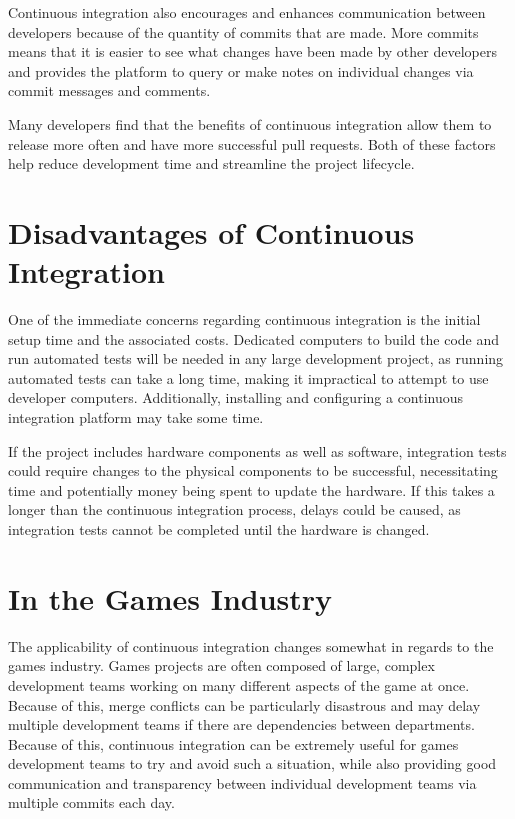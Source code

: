 \documentclass{scrartcl}
\begin{document}
Continuous integration also encourages and enhances communication between developers because of the quantity of commits that are made. More commits means that it is easier to see what changes have been made by other developers and provides the platform to query or make notes on individual changes via commit messages and comments.

Many developers find that the benefits of continuous integration allow them to release more often and have more successful pull requests. Both of these factors help reduce development time and streamline the project lifecycle. \cite{openSourceCI}


\section{Disadvantages of Continuous Integration}

One of the immediate concerns regarding continuous integration is the initial setup time and the associated costs. \cite{effectivenessCI} Dedicated computers to build the code and run automated tests will be needed in any large development project, as running automated tests can take a long time, making it impractical to attempt to use developer computers. \cite{gamasutraCITests} Additionally, installing and configuring a continuous integration platform may take some time. 

If the project includes hardware components as well as software, integration tests could require changes to the physical components to be successful, necessitating time and potentially money being spent to update the hardware. If this takes a longer than the continuous integration process, delays could be caused, as integration tests cannot be completed until the hardware is changed. \cite{largeScaleAgile}


\section{In the Games Industry}

The applicability of continuous integration changes somewhat in regards to the games industry. Games projects are often composed of large, complex development teams working on many different aspects of the game at once. Because of this, merge conflicts can be particularly disastrous and may delay multiple development teams if there are dependencies between departments. Because of this, continuous integration can be extremely useful for games development teams to try and avoid such a situation, while also providing good communication and transparency between individual development teams via multiple commits each day. 
\end{document}

